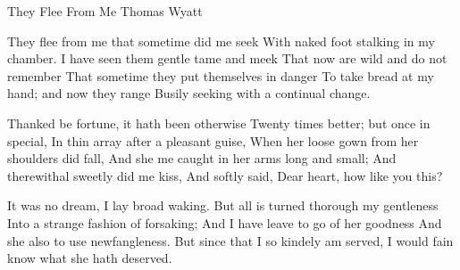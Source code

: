 \begin{poem}
  {They Flee From Me}
  {Thomas Wyatt}

They flee from me that sometime did me seek
With naked foot stalking in my chamber.
I have seen them gentle tame and meek
That now are wild and do not remember
That sometime they put themselves in danger
To take bread at my hand; and now they range
Busily seeking with a continual change.

Thanked be fortune, it hath been otherwise
Twenty times better; but once in special,
In thin array after a pleasant guise,
When her loose gown from her shoulders did fall,
And she me caught in her arms long and small;
And therewithal sweetly did me kiss,
And softly said, Dear heart, how like you this?

It was no dream, I lay broad waking.
But all is turned thorough my gentleness
Into a strange fashion of forsaking;
And I have leave to go of her goodness
And she also to use newfangleness.
But since that I so kindely am served,
I would fain know what she hath deserved.
\end{poem}


